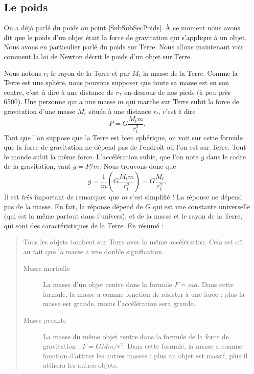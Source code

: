 \documentclass[a4paper,12pt]{book}
\theoremstyle{mes_exemples}	\newtheorem{exemple}[numtho]{Exemple}
\theoremstyle{mes_tho}
\begin{document}
\subsection{Le poids}		\label{SubSecPoidsGr}

On a déjà parlé du poids au point \ref{SubSubSecPoids}. À ce moment nous avons dit que le poids d'un objet était la force de gravitation qui s'applique à un objet. Nous avons en particulier parlé du poids sur Terre. Nous allons maintenant voir comment la loi de Newton décrit le poids d'un objet sur Terre.

Nous notons $r_t$ le rayon de la Terre et par $M_t$ la masse de la Terre. Comme la Terre est une sphère, nous pouvons supposer que toute sa masse est en son centre, c'est à dire à une distance de $r_T$ en-dessous de nos pieds (à peu près \unit{6500}{\kilo\meter}). Une personne qui a une masse $m$ qui marche sur Terre subit la force de gravitation d'une masse $M_t$ située à une distance $r_t$, c'est à dire
\[ 
  P=G\frac{ M_tm }{ r_t^2 }.
\]
Tant que l'on suppose que la Terre est bien sphérique, on voit sur cette formule que la force de gravitation ne dépend pas de l'endroit où l'on est sur Terre. Tout le monde subit la même force. L'accélération subie, que l'on note $g$ dans le cadre de la gravitation, vaut $g=P/m$. Nous trouvons donc que
\[ 
  g=\frac{1}{ m }\left( G\frac{ M_tm }{ r_t^2 }\right)=G\frac{ M_t }{ r_t^2 }.
\]
Il est \emph{très} important de remarquer que $m$ s'est simplifié ! La réponse ne dépend pas de la masse. En fait, la réponse dépend de $G$ qui est une constante universelle (qui est la même partout dans l'univers), et de la masse et le rayon de la Terre, qui sont des caractéristiques de la Terre. En résumé :
\begin{quote}
Tous les objets tombent sur Terre avec la même accélération. Cela est dû au fait que la masse a une double signification.
\begin{description}
\item[Masse inertielle] La masse d'un objet rentre dans la formule $F=ma$. Dans cette formule, la masse a comme fonction de résister à une force : plus la masse est grande, moins l'accélération sera grande.
\item[Masse pesante] La masse du même objet rentre dans la formule de la force de gravitation : $F=GMm/r^2$. Dans cette formule, la masse a comme fonction d'attirer les autres masses : plus un objet est massif, plus il attirera les autres objets. 
\end{description}
\end{quote}
\end{document}
